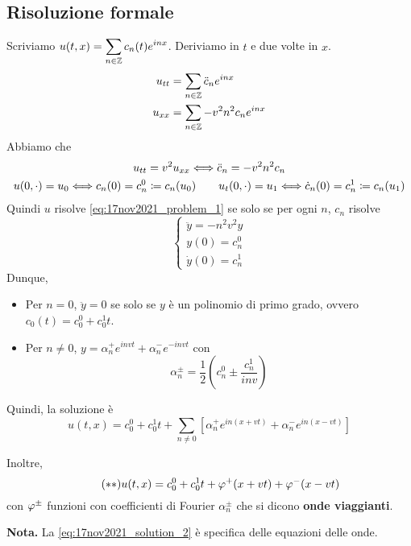 \subsection{Risoluzione formale}

Scriviamo $\displaystyle u(t,x) = \sum_{n \in \mathbb Z} c_n(t) e^{inx}$. Deriviamo in $t$ e due volte in $x$.
\begin{align*}
	u_{tt} & = \sum_{n \in \mathbb Z} \ddot c_n e^{inx} \\
	u_{xx} & = \sum_{n \in \mathbb Z} - v^2 n^2 c_n e^{inx}
\end{align*}
Abbiamo che
\begin{gather*}
	u_{tt} = v^2 u_{xx} \Longleftrightarrow \ddot c_n = -v^2 n^2 c_n \\
	u(0, \cdot) = u_0 \Longleftrightarrow c_n(0) = c_n^0 \coloneqq c_n(u_0)
	\qquad
	u_t(0, \cdot) = u_1 \Longleftrightarrow \dot c_n(0) = c_n^1 \coloneqq c_n(u_1)
\end{gather*}
Quindi $u$ risolve \eqref{eq:17nov2021_problem_1} se solo se per ogni $n$, $c_n$ risolve
%
\begin{equation}
\tag{P$'$} \label{eq:17nov2021_problem_2}
\begin{cases}
	\ddot y = -n^2 v^2 y \\
	y(0) = c_n^0 \\
	\dot y(0) = c_n^1
\end{cases} 
\end{equation}
%
Dunque,
\begin{itemize}

	\item Per $n = 0$, $\ddot y = 0$ se solo se $y$ è un polinomio di primo grado, ovvero $c_0(t) = c_0^0 + c_0^1 t$.


	\item Per $n \neq 0$, $y = \alpha_{n}^+ e^{invt} + \alpha_n^- e^{-invt} $ con 
	$$
		\alpha_n^{\pm} = \frac{1}{2} \left( c_n^0 \pm \frac{c_n^1}{inv} \right)
	$$                                 

\end{itemize}
%
Quindi, la soluzione è
\begin{equation}
 \tag{$\ast$} \label{eq:17nov2021_solution_1}
	u(t,x) = c_0^0 + c_0^1 t + \sum_{n\neq 0} \left[ \alpha_n^+ e^{in(x + vt)} + \alpha_n^- e^{in(x - vt)} \right]
\end{equation}

Inoltre,
\begin{equation}
\tag{$\ast \ast$} \label{eq:17nov2021_solution_2}
	u(t,x) = c_0^0 + c_0^1 t + \varphi^+(x + vt) + \varphi^-(x - vt)
\end{equation}
con $\varphi^{\pm}$ funzioni con coefficienti di Fourier $\alpha_n^{\pm}$ che si dicono \textbf{onde viaggianti}.

\textbf{Nota.} La \eqref{eq:17nov2021_solution_2} è specifica delle equazioni delle onde.
